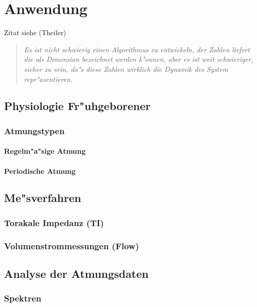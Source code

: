 \chapter{Anwendung}

Zitat siehe \autor(Theiler)
\begin{quote} \em
Es ist nicht schwierig einen Algorithmus zu entwickeln, der Zahlen liefert die als Dimension
bezeichnet werden k"onnen, aber es ist weit schwieriger, sicher zu sein, da"s diese Zahlen
wirklich die Dynamik des System repr"asentieren.
\end{quote}



\section{Physiologie Fr"uhgeborener}

\subsection{Atmungstypen}

\subsubsection{Regelm"a"sige Atmung}

\subsubsection{Periodische Atmung}

\section{Me"sverfahren}

\subsection{Torakale Impedanz (TI)}

\subsection{Volumenstrommessungen (Flow)}

\section{Analyse der Atmungsdaten}

\subsection{Spektren}

